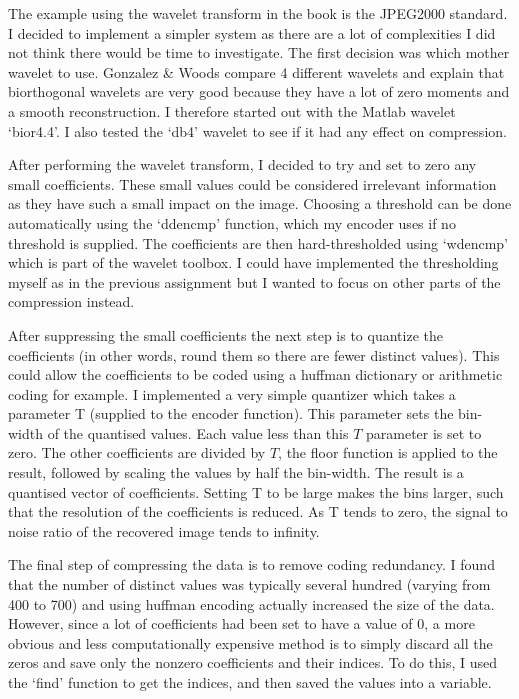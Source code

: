 \documentclass[a4paper]{article}
\begin{document}
The example using the wavelet transform in the book is the JPEG2000 standard. I decided to implement a simpler system as there are a lot of complexities I did not think there would be time to investigate. The first decision was which mother wavelet to use. Gonzalez \& Woods compare 4 different wavelets and explain that biorthogonal wavelets are very good because they have a lot of zero moments and a smooth reconstruction. I therefore started out with the Matlab wavelet `bior4.4'. I also tested the `db4' wavelet to see if it had any effect on compression.

After performing the wavelet transform, I decided to try and set to zero any small coefficients. These small values could be considered irrelevant information as they have such a small impact on the image. Choosing a threshold can be done automatically using the `ddencmp' function, which my encoder uses if no threshold is supplied.
The coefficients are then hard-thresholded using `wdencmp' which is part of the wavelet toolbox. I could have implemented the thresholding myself as in the previous assignment but I wanted to focus on other parts of the compression instead.

After suppressing the small coefficients the next step is to quantize the coefficients (in other words, round them so there are fewer distinct values). This could allow the coefficients to be coded using a huffman dictionary or arithmetic coding for example. I implemented a very simple quantizer which takes a parameter T (supplied to the encoder function). This parameter sets the bin-width of the quantised values. Each value less than this $T$ parameter is set to zero. The other coefficients are divided by $T$,  the floor function is applied to the result, followed by scaling the values by half the bin-width. The result is a quantised vector of coefficients. Setting T to be large makes the bins larger, such that the resolution of the coefficients is reduced. As T tends to zero, the signal to noise ratio of the recovered image tends to infinity.

The final step of compressing the data is to remove coding redundancy. I found that the number of distinct values was typically several hundred (varying from 400 to 700) and using huffman encoding actually increased the size of the data. However, since a lot of coefficients had been set to have a value of 0, a more obvious and less computationally expensive method is to simply discard all the zeros and save only the nonzero coefficients and their indices. To do this, I used the `find' function to get the indices, and then saved the values into a variable.
\end{document}
